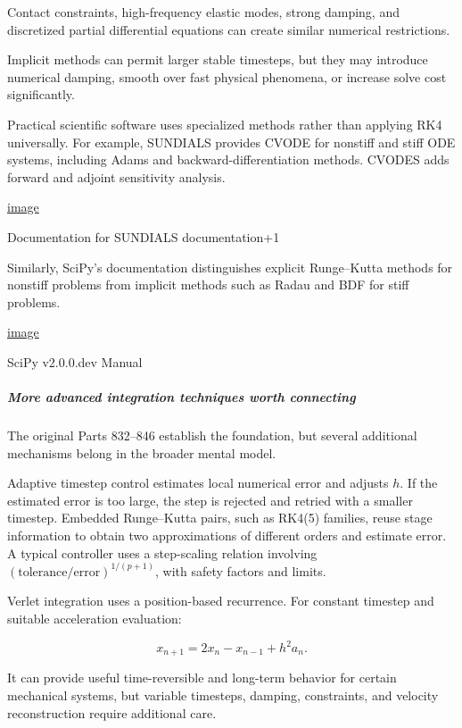 Contact constraints, high-frequency elastic modes, strong damping, and discretized partial differential equations can create similar numerical restrictions.

Implicit methods can permit larger stable timesteps, but they may introduce numerical damping, smooth over fast physical phenomena, or increase solve cost significantly.

Practical scientific software uses specialized methods rather than applying RK4 universally. For example, SUNDIALS provides CVODE for nonstiff and stiff ODE systems, including Adams and backward-differentiation methods. CVODES adds forward and adjoint sensitivity analysis. 

\href{https://www.google.com/s2/favicons?domain=https://sundials.readthedocs.io&sz=32}{image}

Documentation for SUNDIALS documentation+1

Similarly, SciPy's  documentation distinguishes explicit Runge--Kutta methods for nonstiff problems from implicit methods such as Radau and BDF for stiff problems. 

\href{https://www.google.com/s2/favicons?domain=https://scipy.github.io&sz=32}{image}

SciPy v2.0.0.dev Manual

\subparagraph{More advanced integration techniques worth connecting}\label{02-foundations-ii-ch025-more-advanced-integration-techniques-worth-connecting}

\hypertarget{02-foundations-ii-ch025-more-advanced-integration-techniques-worth-connecting}{}

The original Parts 832--846 establish the foundation, but several additional mechanisms belong in the broader mental model.

Adaptive timestep control estimates local numerical error and adjusts \(h\). If the estimated error is too large, the step is rejected and retried with a smaller timestep. Embedded Runge--Kutta pairs, such as RK4(5) families, reuse stage information to obtain two approximations of different orders and estimate error. A typical controller uses a step-scaling relation involving \((\text{tolerance}/\text{error})^{1/(p+1)}\), with safety factors and limits.

Verlet integration uses a position-based recurrence. For constant timestep and suitable acceleration evaluation:

\[
x_{n+1}=2x_n-x_{n-1}+h^2a_n.
\]

It can provide useful time-reversible and long-term behavior for certain mechanical systems, but variable timesteps, damping, constraints, and velocity reconstruction require additional care.

